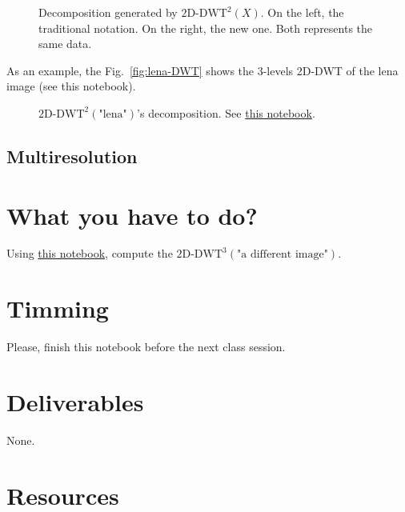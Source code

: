 \begin{figure}
  \centering
  \caption{Decomposition generated by $\text{2D-DWT}^2(X)$. On the
    left, the traditional notation. On the right, the new one. Both
    represents the same data.}
  \label{fig:2D-DWT}
\end{figure}

As an example, the Fig.~\ref{fig:lena-DWT} shows the $3$-levels
2D-DWT of the lena image (see this notebook).

\begin{figure}
  \centering
  \caption{$\text{2D-DWT}^2(\text{"lena"})$'s decomposition. See
    \href{https://github.com/Sistemas-Multimedia/Sistemas-Multimedia.github.io/blob/master/study_guide/06-2D-DWT/dwt_lena.ipynb}{this
      notebook}.}
  \label{fig:2D-DWT}
\end{figure}

\subsection{Multiresolution}

\section{What you have to do?}
Using
\href{https://github.com/Sistemas-Multimedia/Sistemas-Multimedia.github.io/blob/master/study_guide/06-2D-DWT/dwt_lena.ipynb}{this
  notebook}, compute the
$\text{2D-DWT}^3(\text{"a different image"})$.

\section{Timming}

Please, finish this notebook before the next class session.

\section{Deliverables}

None.

\section{Resources}


